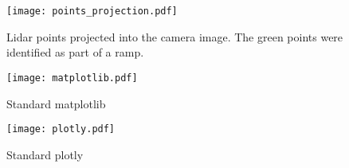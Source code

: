 


\begin{figure}[htbp]
    \centering
    \texttt{[image: points\_projection.pdf]}
    \caption{Lidar points projected into the camera image. The green points were identified as part of a ramp.}
\end{figure}

\begin{figure}[htbp]
    \centering
    \texttt{[image: matplotlib.pdf]}
    \caption{Standard matplotlib}
\end{figure}

\begin{figure}[htbp]
    \centering
    \texttt{[image: plotly.pdf]}
    \caption{Standard plotly}
\end{figure}